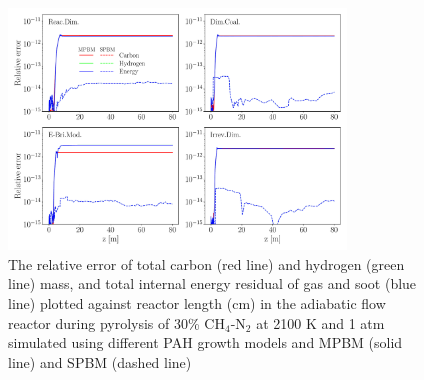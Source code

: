 \begin{figure}[H]
	\centering
	\includegraphics[width=0.8\textwidth]{Figures/Results/Validation/PFR/relerr_pfr.pdf}
	\caption{The relative error of total carbon (red line) and hydrogen (green line) mass, and total internal energy residual of gas and soot (blue line) plotted against reactor length (cm) in the adiabatic flow reactor during pyrolysis of 30\% $\mathrm{CH_4}$-$\mathrm{N_2}$ at 2100 K and 1 atm simulated using different PAH growth models and MPBM (solid line) and SPBM (dashed line)}
	\label{fig:pfrvalid}
\end{figure}